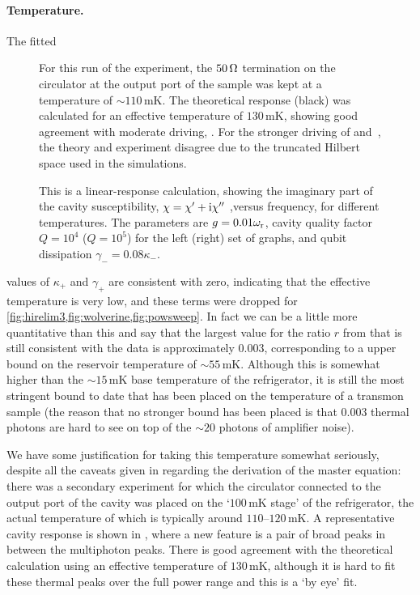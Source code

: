 \paragraph{Temperature.} The fitted
 \begin{figure}
 \centering
 \caption[Strongly driven vacuum Rabi at elevated temperature]
 { For this run of the experiment, the $50\,\text{\textohm}$ termination on the circulator at the output port of the sample was kept at a temperature of $\sim110\,\text{mK}$. The theoretical response (black) was calculated for an effective temperature of $130\,\text{mK}$, showing good agreement with moderate driving, . For the stronger driving of  and~, the theory and experiment disagree due to the truncated Hilbert space used in the simulations.\label{fig:hothothot}}
 \end{figure}%
 \begin{figure}
 \centering
 \caption[Vacuum Rabi splitting at elevated temperature]
 { This is a linear-response calculation, showing the imaginary part of the cavity susceptibility, $\chi=\chi'+\mathrm{i} \chi''$ ,versus frequency, for different temperatures. The parameters are $g = 0.01 \omega_{\text{r}}$, cavity quality factor $Q = 10^4$ ($Q = 10^5$) for the left (right) set of graphs, and qubit dissipation $\gamma_- = 0.08\kappa_-$.\label{fig:rau}}
 \end{figure}%
values of $\kappa_+$ and $\gamma_+$ are consistent with zero, indicating that the effective temperature is very low, and these terms were dropped for \cref{fig:hirelim3,fig:wolverine,fig:powsweep}. In fact we can be a little more quantitative than this and say that the largest value for the ratio $r$ from  that is still consistent with the data is approximately $0.003$, corresponding to a upper bound on the reservoir temperature of $\sim55\,\text{mK}$. Although this is somewhat higher than the $\sim15\,\text{mK}$ base temperature of the refrigerator, it is still the most stringent bound to date that has been placed on the temperature of a transmon sample (the reason that no stronger bound has been placed is that $0.003$ thermal photons are hard to see on top of the $\sim20$ photons of amplifier noise).

We have some justification for taking this temperature somewhat seriously, despite all the caveats given in  regarding the derivation of the master equation: there was a secondary experiment for which the circulator connected to the output port of the cavity was placed on the `$100\,\text{mK}$ stage' of the refrigerator, the actual temperature of which is typically around $110\text{--}120\,\text{mK}$. A representative cavity response is shown in , where a new feature is a pair of broad peaks in between the multiphoton peaks. There is good agreement with the theoretical calculation using an effective temperature of $130\,\text{mK}$, although it is hard to fit these thermal peaks over the full power range and this is a `by eye' fit.

